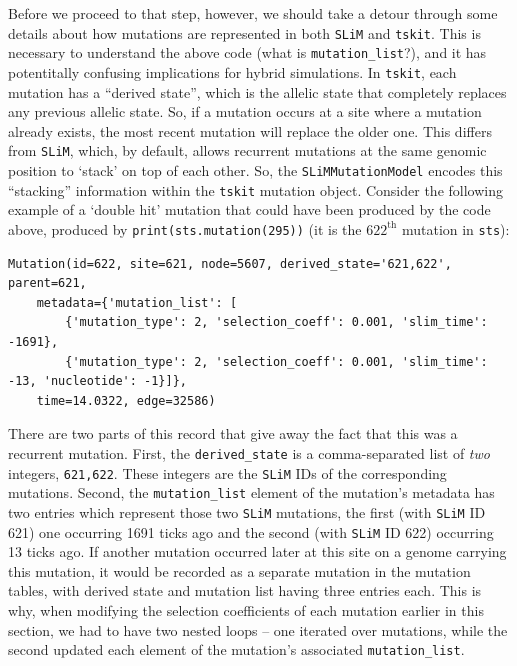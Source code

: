 \documentclass[12pt]{article}
\newcommand{\tskit}[0]{\texttt{tskit}\xspace}
\newcommand{\slim}[0]{\texttt{SLiM}\xspace}
\begin{document}
Before we proceed to that step, however, we should take a detour through
some details about how mutations are represented in both \slim and \tskit. 
This is necessary to understand the above code (what is \verb|mutation_list|?),
and it has potentitally confusing implications for hybrid simulations. 
In \tskit, each mutation has a ``derived state'', which is the allelic state that completely replaces any previous allelic state.
So, if a mutation occurs at a site where a mutation already exists,
the most recent mutation will replace the older one.
This differs from \slim, which, by default, allows recurrent mutations at the same genomic
position to `stack' on top of each other.
So, the \verb|SLiMMutationModel| encodes this ``stacking'' information within the \tskit mutation object.
Consider the following example of a `double hit' mutation
that could have been produced by the code above, produced by \verb|print(sts.mutation(295))|
(it is the $622^\text{th}$ mutation in \verb|sts|):
\begin{verbatim}
Mutation(id=622, site=621, node=5607, derived_state='621,622', parent=621, 
    metadata={'mutation_list': [
        {'mutation_type': 2, 'selection_coeff': 0.001, 'slim_time': -1691},
        {'mutation_type': 2, 'selection_coeff': 0.001, 'slim_time': -13, 'nucleotide': -1}]},
    time=14.0322, edge=32586)
\end{verbatim}
There are two parts of this record that give away the fact that this was a recurrent mutation.
First, the \verb|derived_state| is a comma-separated list of \emph{two} integers, \verb|621,622|.
These integers are the \slim IDs of the corresponding mutations.
Second, the \verb|mutation_list| element of the mutation's metadata has two entries which represent those two \slim mutations,
the first (with \slim ID 621) one occurring 1691 ticks ago and the second (with \slim ID 622)  occurring 13 ticks ago.
If another mutation occurred later at this site on a genome carrying this mutation,
it would be recorded as a separate mutation in the mutation tables,
with derived state and mutation list having three entries each.
This is why, when modifying
the selection coefficients of each mutation earlier in this section, we had to have two nested loops --
one iterated over mutations,
while the second updated each element of the mutation's associated \verb|mutation_list|.
\end{document}
